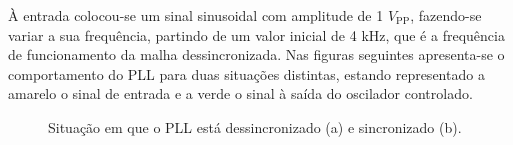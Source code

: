 \documentclass[11pt]{article}
\numberwithin{equation}{section}
\begin{document}
À entrada colocou-se um sinal sinusoidal com amplitude de 1 $V_{\text{PP}}$, fazendo-se variar a sua frequência, partindo de um valor inicial de 4 kHz, que é a frequência de funcionamento da malha dessincronizada. Nas figuras seguintes apresenta-se o comportamento do PLL para duas situações distintas, estando representado a amarelo o sinal de entrada e a verde o sinal à saída do oscilador controlado.

\begin{figure}[H]
	\centering
	\hspace{8mm}
	\vspace{-0.8em}
	\caption{Situação em que o PLL está dessincronizado (a) e sincronizado (b).}
	\label{fig:PLL}
	\vspace{-0.8em}
\end{figure}
\end{document}
